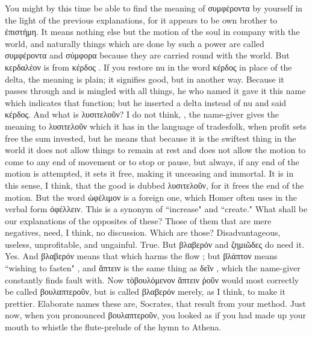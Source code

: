 {{{{{\socratesspeaks
You might by this time be able to find the meaning of συμφέροντα by yourself in the light of the previous explanations, for it appears to be own brother to ἐπιστήμη. It means nothing else but the motion  of the soul in company with the world, and naturally things which are done by such a power are called συμφέροντα and σύμφορα because they are carried round with  the world. But κερδαλέον is from κέρδος .  If you restore nu in the word κέρδος in place of the delta, the meaning is plain; it signifies good, but in another way. Because it passes through and is mingled  with all things, he who named it gave it this name which indicates that function; but he inserted a delta instead of nu and said κέρδος.
\hermogenesspeaks
And what is λυσιτελοῦν?
\socratesspeaks
I do not think, \hermogenesspeaks, the name-giver gives the meaning to λυσιτελοῦν which it has in the language of tradesfolk, when profit sets free  the sum invested,  but he means that because it is the swiftest thing in the world it does not allow things to remain at rest and does not allow the motion to come to any end  of movement or to stop or pause, but always, if any end of the motion is attempted, it sets it free, making it unceasing and immortal. It is in this sense, I think, that the good is dubbed λυσιτελοῦν, for it frees  the end  of the motion. But the word ὠφέλιμον is a foreign one, which Homer often uses in the verbal form ὀφέλλειν. This is a synonym of ``increase" and ``create." 
\hermogenesspeaks
What shall be our explanations of the opposites of these?
\socratesspeaks
Those of them that are mere negatives, need, I think, no discussion.
\hermogenesspeaks
Which are those?
\socratesspeaks
Disadvantageous, useless, unprofitable, and ungainful.
\hermogenesspeaks
True.
\socratesspeaks
But βλαβερόν  and ζημιῶδες  do need it.
\hermogenesspeaks
Yes.
\socratesspeaks
And βλαβερόν means that which harms  the flow ;  but βλάπτον means ``wishing to fasten" , and ἅπτειν is the same thing as δεῖν , which the name-giver constantly finds fault with. Now τὸβουλόμενον ἅπτειν ῥοῦν  would most correctly be called βουλαπτεροῦν, but is called βλαβερόν merely, as I think, to make it prettier.
\hermogenesspeaks
Elaborate names these are, Socrates, that result from your method. Just now,  when you pronounced βουλαπτεροῦν, you looked as if you had made up your mouth to whistle the flute-prelude of the hymn to Athena.
}}}}}
